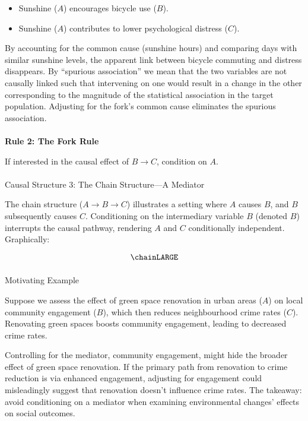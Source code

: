 \documentclass[
  singlecolumn]{article}
\makeatletter
\let\oldparagraph\paragraph
\renewcommand{\paragraph}{
    \@ifstar
      \xxxParagraphStar
      \xxxParagraphNoStar
  }
\newcommand{\xxxParagraphStar}[1]{\oldparagraph*{#1}\mbox{}}
\newcommand{\xxxParagraphNoStar}[1]{\oldparagraph{#1}\mbox{}}
\let\oldsubparagraph\subparagraph
\renewcommand{\subparagraph}{
    \@ifstar
      \xxxSubParagraphStar
      \xxxSubParagraphNoStar
  }
\newcommand{\xxxSubParagraphStar}[1]{\oldsubparagraph*{#1}\mbox{}}
\newcommand{\xxxSubParagraphNoStar}[1]{\oldsubparagraph{#1}\mbox{}}
\providecommand{\tightlist}{%
  \setlength{\itemsep}{0pt}\setlength{\parskip}{0pt}}\usepackage{longtable,booktabs,array}
\makeatother
\begin{document}
\begin{itemize}
\tightlist
\item
  Sunshine (\(A\)) encourages bicycle use (\(B\)).
\item
  Sunshine (\(A\)) contributes to lower psychological distress (\(C\)).
\end{itemize}

By accounting for the common cause (sunshine hours) and comparing days
with similar sunshine levels, the apparent link between bicycle
commuting and distress disappears. By ``spurious association'' we mean
that the two variables are not causally linked such that intervening on
one would result in a change in the other corresponding to the magnitude
of the statistical association in the target population. Adjusting for
the fork's common cause eliminates the spurious association.

\paragraph{\texorpdfstring{\textbf{Rule 2: The Fork
Rule}}{Rule 2: The Fork Rule}}\label{rule-2-the-fork-rule}

If interested in the causal effect of \(B \to C\), condition on
\(\boxed{A}\).

\paragraph{Causal Structure 3: The Chain Structure---A
Mediator}\label{causal-structure-3-the-chain-structurea-mediator}

The chain structure (\(A \rightarrow B \rightarrow C\)) illustrates a
setting where \(A\) causes \(B\), and \(B\) subsequently causes \(C\).
Conditioning on the intermediary variable \(B\) (denoted \(\boxed{B}\))
interrupts the causal pathway, rendering \(A\) and \(C\) conditionally
independent. Graphically:

\[
\chainLARGE
\]

\subparagraph{Motivating Example}\label{motivating-example-2}

Suppose we assess the effect of green space renovation in urban areas
(\(A\)) on local community engagement (\(B\)), which then reduces
neighbourhood crime rates (\(C\)). Renovating green spaces boosts
community engagement, leading to decreased crime rates.

Controlling for the mediator, community engagement, might hide the
broader effect of green space renovation. If the primary path from
renovation to crime reduction is via enhanced engagement, adjusting for
engagement could misleadingly suggest that renovation doesn't influence
crime rates. The takeaway: avoid conditioning on a mediator when
examining environmental changes' effects on social outcomes.
\end{document}
